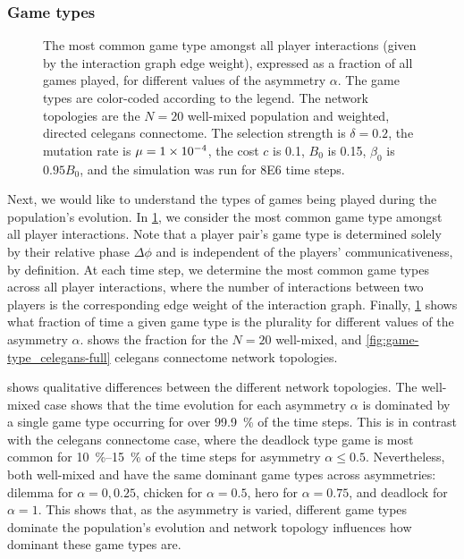 \documentclass[pdflatex,lineno,referee,sn-mathphys-ay]{sn-jnl}
\begin{document}
\subsubsection{Game types}
\begin{figure}
  \centering
  
  \caption{
    The most common game type amongst all player interactions
    (given by the interaction graph edge weight),
    expressed as a fraction of all games played,
    for different values of the asymmetry $\alpha$.
    The game types are color-coded according to the legend.
    The network topologies are the
    $N=20$ well-mixed population
    and
    weighted, directed \gls{celegans} connectome.
    The selection strength is $\delta=0.2$,
    the mutation rate is $\mu=\num{1E-4}$,
    the cost $c$ is \num{0.1},
    $B_0$ is \num{0.15},
    $\beta_0$ is $\num{0.95} B_0$,
    and the simulation was run for \num{8E6} time steps.
  }
  \label{fig:game-type}
\end{figure}

Next, we would like to understand the types of games being played
during the population's evolution.
In \cref{fig:game-type}, we consider the most common game type
amongst all player interactions.
Note that a player pair's game type is determined solely
by their relative phase $\Delta \phi$ and is independent
of the players' communicativeness, by definition.
At each time step, we determine the most common game types
across all player interactions,
where the number of interactions between two players
is the corresponding edge weight of the interaction graph.
Finally, \cref{fig:game-type} shows what fraction of time
a given game type is the plurality for different values
of the asymmetry $\alpha$.
shows the fraction for the
$N=20$ well-mixed,
and
\cref{fig:game-type_celegans-full}
\gls{celegans} connectome network topologies.

 shows qualitative differences
between the different network topologies.
The  well-mixed case
shows that the time evolution for each asymmetry $\alpha$
is dominated by a single game type
occurring for over \SI{99.9}{\percent} of the time steps.
This is in contrast with the
 \gls{celegans} connectome case,
where the deadlock type game is most common
for \SIrange{10}{15}{\percent} of the time steps
for asymmetry $\alpha \le 0.5$.
Nevertheless, both  well-mixed
and  have the same dominant game types
across asymmetries:
dilemma for $\alpha = 0, 0.25$, chicken for $\alpha = 0.5$,
hero for $\alpha = 0.75$, and deadlock for $\alpha = 1$.
This shows that, as the asymmetry is varied,
different game types dominate the population's evolution
and network topology influences how dominant these game types are.
\end{document}
